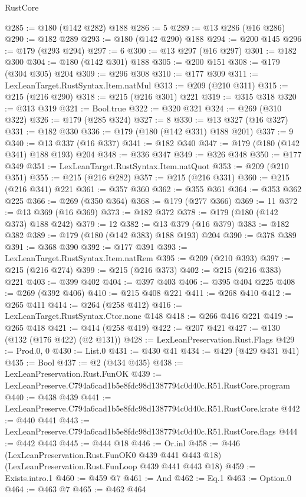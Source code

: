 \begin{lexlean}{RustCore}
\begin{coremodule}
@285 := @180 (@142 @282) @188
@286 := 5
@289 := @13 @286 (@16 @286)
@290 := @182 @289
@293 := @180 (@142 @290) @188
@294 := @200 @145
@296 := @179 (@293 @294)
@297 := 6
@300 := @13 @297 (@16 @297)
@301 := @182 @300
@304 := @180 (@142 @301) @188
@305 := @200 @151
@308 := @179 (@304 @305) @204
@309 := @296 @308
@310 := @177 @309
@311 := LexLeanTarget.RustSyntax.Item.natMul
@313 := @209 (@210 @311)
@315 := @215 (@216 @290)
@318 := @215 (@216 @301) @221
@319 := @315 @318
@320 := @313 @319
@321 := Bool.true
@322 := @320 @321
@324 := @269 (@310 @322)
@326 := @179 (@285 @324)
@327 := 8
@330 := @13 @327 (@16 @327)
@331 := @182 @330
@336 := @179 (@180 (@142 @331) @188 @201)
@337 := 9
@340 := @13 @337 (@16 @337)
@341 := @182 @340
@347 := @179 (@180 (@142 @341) @188 @193) @204
@348 := @336 @347
@349 := @326 @348
@350 := @177 @349
@351 := LexLeanTarget.RustSyntax.Item.natQuot
@353 := @209 (@210 @351)
@355 := @215 (@216 @282)
@357 := @215 (@216 @331)
@360 := @215 (@216 @341) @221
@361 := @357 @360
@362 := @355 @361
@364 := @353 @362 @225
@366 := @269 (@350 @364)
@368 := @179 (@277 @366)
@369 := 11
@372 := @13 @369 (@16 @369)
@373 := @182 @372
@378 := @179 (@180 (@142 @373) @188 @242)
@379 := 12
@382 := @13 @379 (@16 @379)
@383 := @182 @382
@389 := @179 (@180 (@142 @383) @188 @193) @204
@390 := @378 @389
@391 := @368 @390
@392 := @177 @391
@393 := LexLeanTarget.RustSyntax.Item.natRem
@395 := @209 (@210 @393)
@397 := @215 (@216 @274)
@399 := @215 (@216 @373)
@402 := @215 (@216 @383) @221
@403 := @399 @402
@404 := @397 @403
@406 := @395 @404 @225
@408 := @269 (@392 @406)
@410 := @215 @408 @221
@411 := @268 @410
@412 := @265 @411
@414 := @264 (@258 @412)
@416 := LexLeanTarget.RustSyntax.Ctor.none @148
@418 := @266 @416 @221
@419 := @265 @418
@421 := @414 (@258 @419)
@422 := @207 @421
@427 := @130 (@132 (@176 @422) (@2 @131))
@428 := LexLeanPreservation.Rust.Flags
@429 := Prod.{0, 0}
@430 := List.{0}
@431 := @430 @41
@434 := @429 (@429 @431 @41)
@435 := Bool
@437 := @2 (@434 @435)
@438 := LexLeanPreservation.Rust.FunOK
@439 := LexLeanPreserve.C794a6cad1b5e8fdc98d1387794c0d40c.R51.RustCore.program
@440 := @438 @439
@441 := LexLeanPreserve.C794a6cad1b5e8fdc98d1387794c0d40c.R51.RustCore.krate
@442 := @440 @441
@443 := LexLeanPreserve.C794a6cad1b5e8fdc98d1387794c0d40c.R51.RustCore.flags
@444 := @442 @443
@445 := @444 @18
@446 := Or.inl
@458 := @446
    (LexLeanPreservation.Rust.FunOK0 @439 @441 @443 @18)
    (LexLeanPreservation.Rust.FunLoop @439 @441 @443 @18)
@459 := Exists.intro.{1}
@460 := @459 @7
@461 := And
@462 := Eq.{1}
@463 := Option.{0}
@464 := @463 @7
@465 := @462 @464

\end{coremodule}
\end{lexlean}
